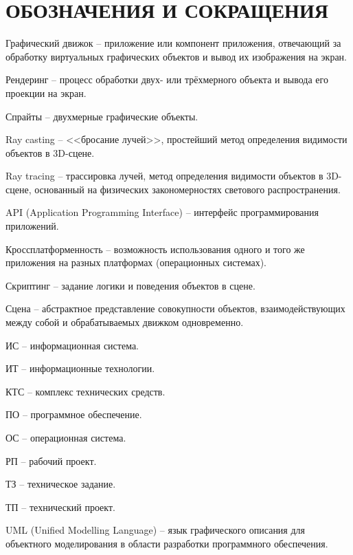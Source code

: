 \section*{ОБОЗНАЧЕНИЯ И СОКРАЩЕНИЯ}

Графический движок -- приложение или компонент приложения, отвечающий за обработку виртуальных графических объектов и вывод их изображения на экран.

Рендеринг -- процесс обработки двух- или трёхмерного объекта и вывода его проекции на экран.

Спрайты -- двухмерные графические объекты.

Ray casting -- <<бросание лучей>>, простейший метод определения видимости объектов в 3D-сцене.

Ray tracing -- трассировка лучей, метод определения видимости объектов в 3D-сцене, основанный на физических закономерностях светового распространения.

API (Application Programming Interface) -- интерфейс программирования приложений.

Кроссплатформенность -- возможность использования одного и того же приложения на разных платформах (операционных системах).

Скриптинг -- задание логики и поведения объектов в сцене.

Сцена -- абстрактное представление совокупности объектов, взаимодействующих между собой и обрабатываемых движком одновременно.

ИС -- информационная система.

ИТ -- информационные технологии.

КТС -- комплекс технических средств.

ПО -- программное обеспечение.

ОС -- операционная система.

РП -- рабочий проект.

ТЗ -- техническое задание.

ТП -- технический проект.

UML (Unified Modelling Language) -- язык графического описания для объектного моделирования в области разработки программного обеспечения.
